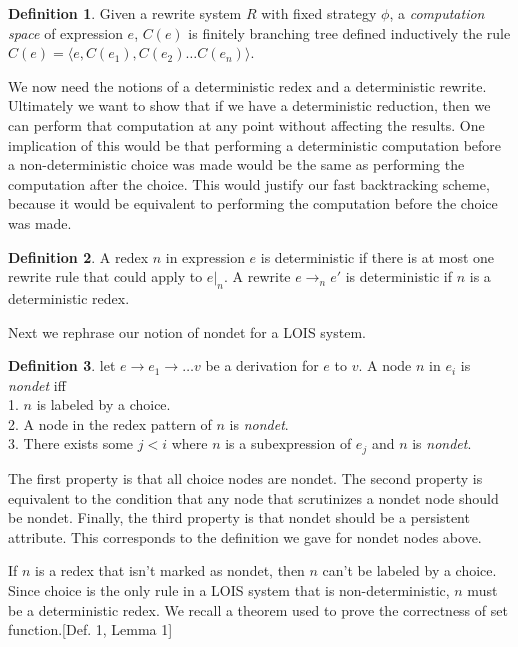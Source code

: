 \documentclass{book}
\theoremstyle{definition}
\newtheorem{definition}{Definition}[section]
\begin{document}
\begin{definition}
Given a rewrite system $R$ with fixed strategy $\phi$, 
a \emph{computation space} \cite{setFunctions} of expression $e$, 
$C(e)$ is finitely branching tree defined inductively the rule
$C(e) = \langle e, C(e_1), C(e_2) \ldots C(e_n)\rangle$.
\end{definition}
\label{def:computationSpace}

We now need the notions of a deterministic redex and a deterministic rewrite.
Ultimately we want to show that if we have a deterministic reduction,
then we can perform that computation at any point without affecting the results.
One implication of this would be that performing a deterministic computation before
a non-deterministic choice was made would be the same as performing the computation
after the choice.
This would justify our fast backtracking scheme, because it would be equivalent
to performing the computation before the choice was made.

\begin{definition}
A redex $n$ in expression $e$ is deterministic if there is at most
one rewrite rule that could apply to $e\vert_n$.
A rewrite $e \to_n e'$ is deterministic if $n$ is a deterministic redex.
\end{definition} \label{def:deterministic}

Next we rephrase our notion of nondet for a LOIS system.

\begin{definition}
let $e \to e_1 \to \ldots v$ be a derivation for $e$ to $v$.
A node $n$ in $e_i$ is  \emph{nondet} iff\\
1. $n$ is labeled by a choice.\\
2. A node in the redex pattern \cite{bubblingCorrect} of $n$ is \emph{nondet}.\\
3. There exists some $j < i$ where $n$ is a subexpression of $e_j$ and $n$ is \emph{nondet}.
\end{definition}

The first property is that all choice nodes are nondet.
The second property is equivalent to the condition that any node 
that scrutinizes a nondet node should be nondet.
Finally, the third property is that nondet should be a persistent attribute.
This corresponds to the definition we gave for nondet nodes above.

If $n$ is a redex that isn't marked as nondet,
then $n$ can't be labeled by a choice.
Since choice is the only rule in a LOIS system that is non-deterministic,
$n$ must be a deterministic redex.
We recall a theorem used to prove the correctness of set function.\cite{setFunctions}[Def. 1, Lemma 1]
\end{document}
